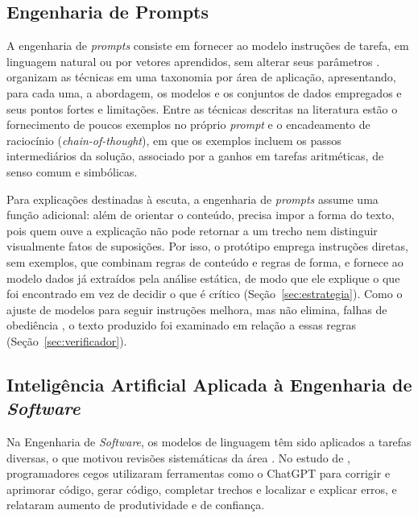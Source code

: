 \documentclass[
    12pt,                   %
    openright,              %
    oneside,                %
    a4paper,                %
    sumario=tradicional,    %
    english,                %
    brazil,                 %
    ]{abntex2}
\begin{document}
\subsection{Engenharia de Prompts}\label{sec:prompts}

A engenharia de \textit{prompts} consiste em fornecer ao modelo instruções de tarefa, em linguagem natural ou por vetores aprendidos, sem alterar seus parâmetros \cite{sahoo2024prompt}. \textcite{sahoo2024prompt} organizam as técnicas em uma taxonomia por área de aplicação, apresentando, para cada uma, a abordagem, os modelos e os conjuntos de dados empregados e seus pontos fortes e limitações. Entre as técnicas descritas na literatura estão o fornecimento de poucos exemplos no próprio \textit{prompt} \cite{brown2020fewshot} e o encadeamento de raciocínio (\textit{chain-of-thought}), em que os exemplos incluem os passos intermediários da solução, associado por \textcite{wei2022cot} a ganhos em tarefas aritméticas, de senso comum e simbólicas.

Para explicações destinadas à escuta, a engenharia de \textit{prompts} assume uma função adicional: além de orientar o conteúdo, precisa impor a forma do texto, pois quem ouve a explicação não pode retornar a um trecho nem distinguir visualmente fatos de suposições. Por isso, o protótipo emprega instruções diretas, sem exemplos, que combinam regras de conteúdo e regras de forma, e fornece ao modelo dados já extraídos pela análise estática, de modo que ele explique o que foi encontrado em vez de decidir o que é crítico (Seção~\ref{sec:estrategia}). Como o ajuste de modelos para seguir instruções melhora, mas não elimina, falhas de obediência \cite{ouyang2022instructions}, o texto produzido foi examinado em relação a essas regras (Seção~\ref{sec:verificador}).

\subsection{Inteligência Artificial Aplicada à Engenharia de \textit{Software}}\label{sec:IAES}

Na Engenharia de \textit{Software}, os modelos de linguagem têm sido aplicados a tarefas diversas, o que motivou revisões sistemáticas da área \cite{hou2024llmse}. No estudo de \textcite{latinoware34224}, programadores cegos utilizaram ferramentas como o ChatGPT para corrigir e aprimorar código, gerar código, completar trechos e localizar e explicar erros, e relataram aumento de produtividade e de confiança.
\end{document}
